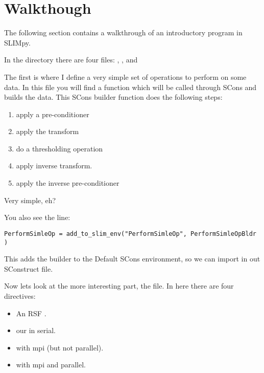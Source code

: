 \documentclass{manual}
\begin{document}
    \chapter{Walkthough \label{intro}}
    
        The following section contains a walkthrough of an introductory program in SLIMpy.
        
        In the  directory there are four files:
        ,
        , 
         and 
        
        The first  is where I define a very simple set of operations to perform on some data.
        In this file you will find a function  which will be called through SCons and builds the data.
        This SCons builder function does the following steps:
        \begin{enumerate}
        \item apply a pre-conditioner 
        \item apply the transform 
        \item do a thresholding operation
        \item apply inverse transform.
        \item apply the inverse pre-conditioner         
        \end{enumerate}        
        Very simple, eh?
        
        You also see the line:
        \begin{verbatim}
PerformSimleOp = add_to_slim_env("PerformSimleOp", PerformSimleOpBldr )
        \end{verbatim}
        
        This adds the builder to the Default SCons environment, so we can import  in out SConstruct file.
	
	Now lets look at the more interesting part, the   file. In here there are four directives:
	\begin{itemize}
	\item An RSF .
	\item our  in serial.
	\item  {} with mpi (but not parallel).
	\item  {} with mpi and  parallel.
	\end{itemize}
	
\end{document}
